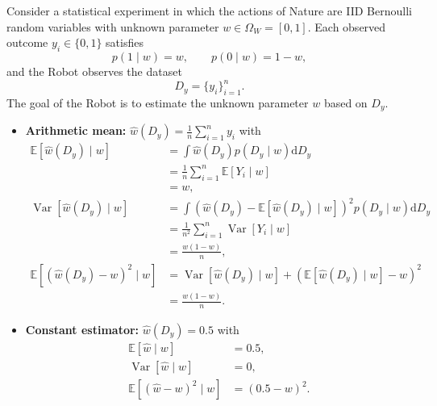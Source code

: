 \begin{example}
	\label{ex:bernoulli_quad_cost}
	Consider a statistical experiment in which the actions of Nature are IID Bernoulli random variables with unknown parameter $w \in \Omega_W = [0,1]$. Each observed outcome $y_i \in \{0,1\}$ satisfies
	\begin{equation}
		p(1 \mid w) = w, \qquad p(0 \mid w) = 1-w,
	\end{equation}
	and the Robot observes the dataset
	\begin{equation}
		D_y = \{y_i\}_{i=1}^n.
	\end{equation}
	The goal of the Robot is to estimate the unknown parameter $w$ based on $D_y$.
	\begin{itemize}
		\item \textbf{Arithmetic mean:} 
		\(
		\hat{w}(D_y) = \frac{1}{n}\sum_{i=1}^n y_i
		\)
		with 
		\begin{equation} 
			\begin{split} 
				\mathbb{E}[\hat{w}(D_y)\mid w] &= \int \hat{w}(D_y) p(D_y\mid w) \mathrm{d}D_y\\ & = \frac{1}{n} \sum_{i=1}^n \mathbb{E}[Y_{i}\mid w]\\ & = w,\\ \operatorname{Var}[\hat{w}(D_y)\mid w] & =\int (\hat{w}(D_y)-\mathbb{E}[\hat{w}(D_y)\mid w])^2 p(D_y\mid w) \mathrm{d}D_y\\ &= \frac{1}{n^2} \sum_{i=1}^n \operatorname{Var}[Y_{i}\mid w]\\ & = \frac{w(1-w)}{n},\\ \mathbb{E}[(\hat{w}(D_y)-w)^2\mid w] &= \operatorname{Var}[\hat{w}(D_y)\mid w]+(\mathbb{E}[\hat{w}(D_y)\mid w]-w)^2\\ & = \frac{w(1-w)}{n}. 
			\end{split} 
		\end{equation}
		
		\item \textbf{Constant estimator:} 
		\(
		\hat{w}(D_y) = 0.5
		\)
		with 
		\begin{equation} 
			\begin{split} 
				\mathbb{E}[\hat{w}\mid w] &= 0.5,\\ \operatorname{Var}[\hat{w}\mid w] &= 0,\\ \mathbb{E}[(\hat{w}-w)^2\mid w] &= (0.5 - w)^2. 
			\end{split} 
			\end{equation}
		

\end{itemize}
\end{example}
